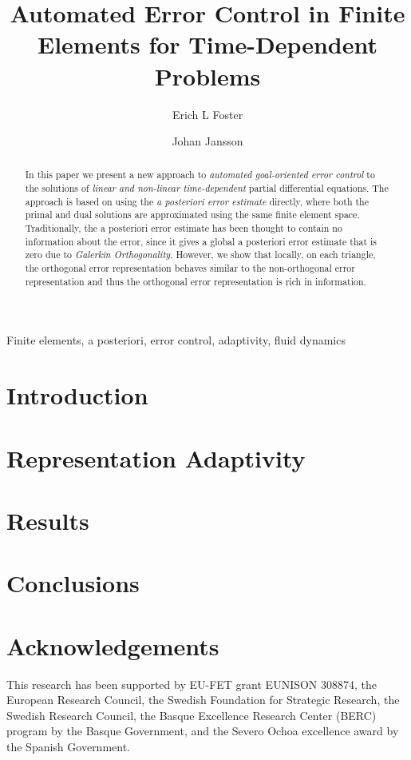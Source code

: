 \documentclass[a4paper]{article}
\author[1]{Erich L Foster}
\author[1,2]{Johan Jansson}
\affil[1]{Basque Center for Applied Mathematics, Bilbao, Basque Country -- Spain}
\affil[2]{CSC, KTH Royal Institute of Technology, Stockholm, Sweden}
\title{Automated Error Control in Finite Elements for Time-Dependent Problems}
\begin{document}
  \maketitle
  \tableofcontents
  \begin{abstract}
    In this paper we present a new approach to \emph{automated goal-oriented
    error control} to the solutions of \emph{linear and non-linear
    time-dependent} partial differential equations. The approach is based on
    using the \emph{a posteriori error estimate} directly, where both the primal
    and dual solutions are approximated using the same finite element space.
    Traditionally, the a posteriori error estimate has been thought to contain
    no information about the error, since it gives a global a posteriori error
    estimate that is zero due to \emph{Galerkin Orthogonality}. However, we show
    that locally, on each triangle, the orthogonal error representation behaves
    similar to the non-orthogonal error representation and thus the orthogonal
    error representation is rich in information.
  \end{abstract}
  \begin{keywords}
    Finite elements, a posteriori, error control, adaptivity, fluid dynamics
  \end{keywords}

  \section{Introduction} \label{sec:Intro}
  

  \section{Representation Adaptivity} \label{sec:Algorithm}
  

  \section{Results} \label{sec:Results}
  

  \section{Conclusions} \label{sec:Conclusions}
  

  \section*{Acknowledgements}
  This research has been supported by EU-FET grant EUNISON 308874, the European
  Research Council, the Swedish Foundation for Strategic Research, the Swedish
  Research Council, the Basque Excellence Research Center (BERC) program by
  the Basque Government, and the Severo Ochoa excellence award by the Spanish
  Government.

  \printbibliography
\end{document}
